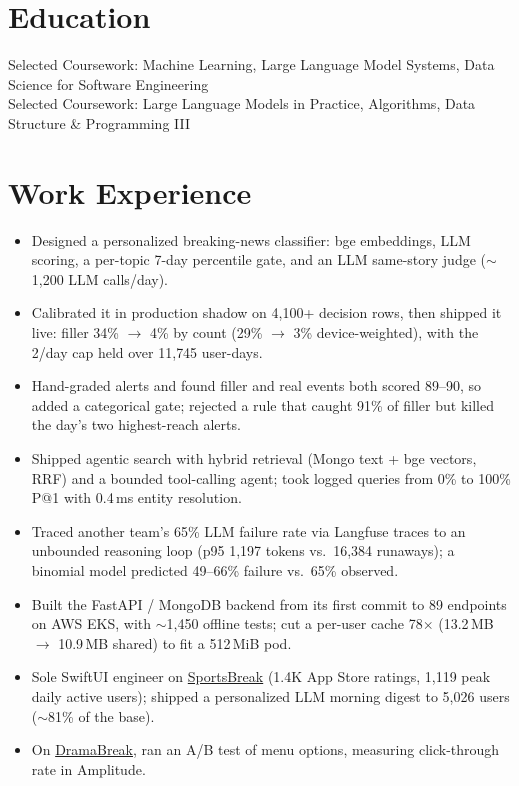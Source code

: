 \documentclass[11pt, letterpaper]{article}
\begin{document}

\section{Education}
Selected Coursework: Machine Learning, Large Language Model Systems, Data Science for Software Engineering\\[1pt]
Selected Coursework: Large Language Models in Practice, Algorithms, Data Structure \& Programming III

\section{Work Experience}
\begin{itemize}
  \item Designed a personalized breaking-news classifier: bge embeddings, LLM scoring, a per-topic 7-day percentile gate, and an LLM same-story judge ($\sim$1{,}200 LLM calls/day).
  \item Calibrated it in production shadow on 4{,}100+ decision rows, then shipped it live: filler 34\% $\to$ 4\% by count (29\% $\to$ 3\% device-weighted), with the 2/day cap held over 11{,}745 user-days.
  \item Hand-graded alerts and found filler and real events both scored 89--90, so added a categorical gate; rejected a rule that caught 91\% of filler but killed the day's two highest-reach alerts.
  \item Shipped agentic search with hybrid retrieval (Mongo text + bge vectors, RRF) and a bounded tool-calling agent; took logged queries from 0\% to 100\% P@1 with 0.4\,ms entity resolution.
  \item Traced another team's 65\% LLM failure rate via Langfuse traces to an unbounded reasoning loop (p95 1{,}197 tokens vs.\ 16{,}384 runaways); a binomial model predicted 49--66\% failure vs.\ 65\% observed.
  \item Built the FastAPI / MongoDB backend from its first commit to 89 endpoints on AWS EKS, with $\sim$1{,}450 offline tests; cut a per-user cache 78$\times$ (13.2\,MB $\to$ 10.9\,MB shared) to fit a 512\,MiB pod.
  \item Sole SwiftUI engineer on \href{https://apps.apple.com/app/id6762649287}{SportsBreak} (1.4K App Store ratings, 1{,}119 peak daily active users); shipped a personalized LLM morning digest to 5{,}026 users ($\sim$81\% of the base).
  \item On \href{https://apps.apple.com/app/id6758861738}{DramaBreak}, ran an A/B test of menu options, measuring click-through rate in Amplitude.
\end{itemize}
\end{document}
